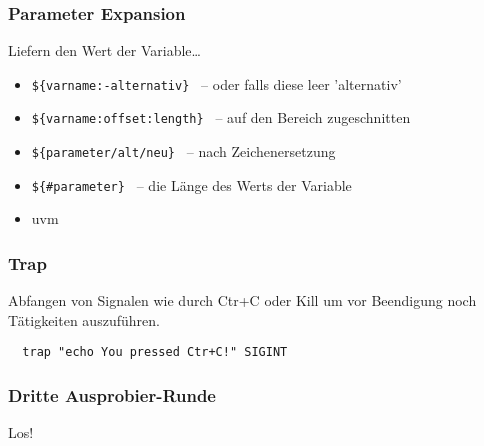 \documentclass{beamer}
\begin{document}
\begin{frame}
 \frametitle{Parameter Expansion}
 
 Liefern den Wert der Variable…
 \begin{itemize}
  \item {\tt \$\{varname:-alternativ\} } -- oder falls diese leer 'alternativ'
  \item {\tt \$\{varname:offset:length\} } -- auf den Bereich zugeschnitten
  \item {\tt \$\{parameter/alt/neu\} } -- nach Zeichenersetzung
  \item {\tt \$\{\#parameter\} } -- die Länge des Werts der Variable
  \item uvm
 \end{itemize}
\end{frame}

\begin{frame}[fragile]
 \frametitle{Trap}
 Abfangen von Signalen wie durch Ctr+C oder Kill um vor Beendigung noch Tätigkeiten auszuführen.
 \bigskip
 
 \begin{lstlisting}
  trap "echo You pressed Ctr+C!" SIGINT 
 \end{lstlisting}
\end{frame}

\begin{frame}
 \frametitle{Dritte Ausprobier-Runde}
 \begin{center}
 Los!
 \end{center}
\end{frame}
\end{document}
